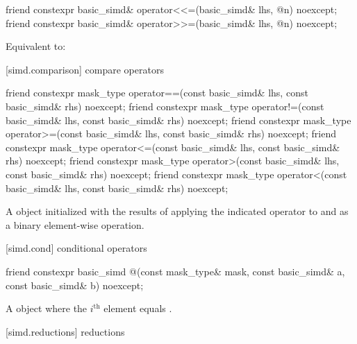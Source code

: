 \begin{itemdecl}
friend constexpr basic_simd& operator<<=(basic_simd& lhs, @\simdsizetype@ n) noexcept;
friend constexpr basic_simd& operator>>=(basic_simd& lhs, @\simdsizetype@ n) noexcept;
\end{itemdecl}

\begin{itemdescr}
  \pnum\ConstraintOperatorTWellFormed

  \pnum\effects
  Equivalent to: 
\end{itemdescr}

[simd.comparison]{ compare operators}

\begin{itemdecl}
friend constexpr mask_type operator==(const basic_simd& lhs, const basic_simd& rhs) noexcept;
friend constexpr mask_type operator!=(const basic_simd& lhs, const basic_simd& rhs) noexcept;
friend constexpr mask_type operator>=(const basic_simd& lhs, const basic_simd& rhs) noexcept;
friend constexpr mask_type operator<=(const basic_simd& lhs, const basic_simd& rhs) noexcept;
friend constexpr mask_type operator>(const basic_simd& lhs, const basic_simd& rhs) noexcept;
friend constexpr mask_type operator<(const basic_simd& lhs, const basic_simd& rhs) noexcept;
\end{itemdecl}

\begin{itemdescr}
  \pnum\ConstraintOperatorTWellFormed

  \pnum\returns
  A  object initialized with the results of applying the indicated operator to  and  as a binary element-wise operation.
\end{itemdescr}

[simd.cond]{ conditional operators}

\begin{itemdecl}
friend constexpr basic_simd
@\simdselect@(const mask_type& mask, const basic_simd& a, const basic_simd& b) noexcept;
\end{itemdecl}

\begin{itemdescr}
  \pnum\returns
  A  object where the $i^\text{th}$ element equals  \foralli.
\end{itemdescr}

[simd.reductions]{ reductions}

